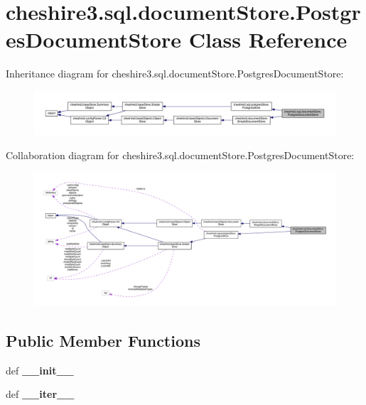 \hypertarget{classcheshire3_1_1sql_1_1document_store_1_1_postgres_document_store}{\section{cheshire3.\-sql.\-document\-Store.\-Postgres\-Document\-Store Class Reference}
\label{classcheshire3_1_1sql_1_1document_store_1_1_postgres_document_store}
}


Inheritance diagram for cheshire3.\-sql.\-document\-Store.\-Postgres\-Document\-Store\-:
\nopagebreak
\begin{figure}[H]
\begin{center}
\leavevmode
\includegraphics[width=350pt]{classcheshire3_1_1sql_1_1document_store_1_1_postgres_document_store__inherit__graph}
\end{center}
\end{figure}


Collaboration diagram for cheshire3.\-sql.\-document\-Store.\-Postgres\-Document\-Store\-:
\nopagebreak
\begin{figure}[H]
\begin{center}
\leavevmode
\includegraphics[width=350pt]{classcheshire3_1_1sql_1_1document_store_1_1_postgres_document_store__coll__graph}
\end{center}
\end{figure}
\subsection*{Public Member Functions}
\begin{DoxyCompactItemize}
\item 
\hypertarget{classcheshire3_1_1sql_1_1document_store_1_1_postgres_document_store_a8cf4a74eea0917ef48e077ab81def74f}{def {\bfseries \-\_\-\-\_\-init\-\_\-\-\_\-}}\label{classcheshire3_1_1sql_1_1document_store_1_1_postgres_document_store_a8cf4a74eea0917ef48e077ab81def74f}

\item 
\hypertarget{classcheshire3_1_1sql_1_1document_store_1_1_postgres_document_store_ae13eb1d54d222461cf1cb026015ab03f}{def {\bfseries \-\_\-\-\_\-iter\-\_\-\-\_\-}}\label{classcheshire3_1_1sql_1_1document_store_1_1_postgres_document_store_ae13eb1d54d222461cf1cb026015ab03f}

\end{DoxyCompactItemize}
